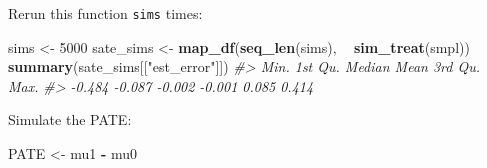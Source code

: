\documentclass[]{book}
\newenvironment{Shaded}{\begin{snugshade}}{\end{snugshade}}
\newcommand{\KeywordTok}[1]{\textcolor[rgb]{0.13,0.29,0.53}{\textbf{#1}}}
\newcommand{\DecValTok}[1]{\textcolor[rgb]{0.00,0.00,0.81}{#1}}
\newcommand{\StringTok}[1]{\textcolor[rgb]{0.31,0.60,0.02}{#1}}
\newcommand{\CommentTok}[1]{\textcolor[rgb]{0.56,0.35,0.01}{\textit{#1}}}
\newcommand{\OperatorTok}[1]{\textcolor[rgb]{0.81,0.36,0.00}{\textbf{#1}}}
\newcommand{\NormalTok}[1]{#1}
\theoremstyle{definition}
\theoremstyle{definition}
\theoremstyle{definition}
\theoremstyle{remark}
\begin{document}
Rerun this function \texttt{sims} times:

\begin{Shaded}
\begin{Highlighting}[]
\NormalTok{sims <-}\StringTok{ }\DecValTok{5000}
\NormalTok{sate_sims <-}\StringTok{ }\KeywordTok{map_df}\NormalTok{(}\KeywordTok{seq_len}\NormalTok{(sims), }\OperatorTok{~}\StringTok{ }\KeywordTok{sim_treat}\NormalTok{(smpl))}
\KeywordTok{summary}\NormalTok{(sate_sims[[}\StringTok{"est_error"}\NormalTok{]])}
\CommentTok{#>    Min. 1st Qu.  Median    Mean 3rd Qu.    Max. }
\CommentTok{#>  -0.484  -0.087  -0.002  -0.001   0.085   0.414}
\end{Highlighting}
\end{Shaded}

Simulate the PATE:

\begin{Shaded}
\begin{Highlighting}[]
\NormalTok{PATE <-}\StringTok{ }\NormalTok{mu1 }\OperatorTok{-}\StringTok{ }\NormalTok{mu0}
\end{Highlighting}
\end{Shaded}
\end{document}
